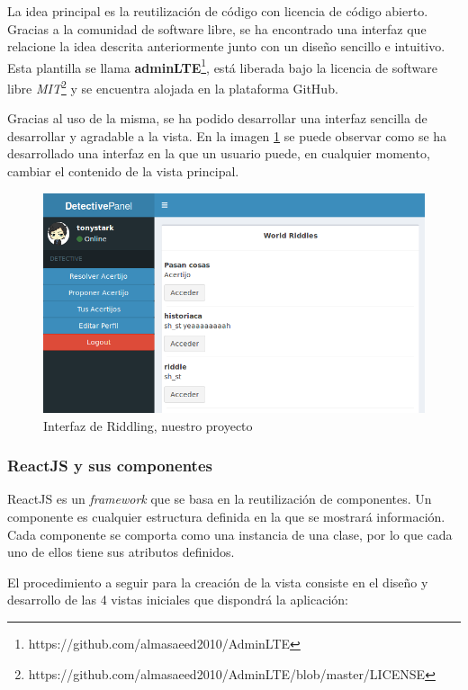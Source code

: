 La idea principal es la reutilización de código con licencia de código abierto. Gracias a la comunidad de software libre, se ha encontrado una interfaz que relacione la idea descrita anteriormente junto con un diseño sencillo e intuitivo. Esta plantilla se llama \textbf{adminLTE}\footnote{https://github.com/almasaeed2010/AdminLTE}, está liberada bajo la licencia de software libre \textit{MIT}\footnote{https://github.com/almasaeed2010/AdminLTE/blob/master/LICENSE} y se encuentra alojada en la plataforma GitHub.

Gracias al uso de la misma, se ha podido desarrollar una interfaz sencilla de desarrollar y agradable a la vista. En la imagen \ref{fig::rid} se puede observar como se ha desarrollado una interfaz en la que un usuario puede, en cualquier momento, cambiar el contenido de la vista principal.

\begin{figure}[htbp]
    \centerline{\includegraphics[width=12cm]{figuras/riddling.png}}
    \caption{Interfaz de Riddling, nuestro proyecto}
    \label{fig::rid}
\end{figure}

\subsubsection{ReactJS y sus componentes}

ReactJS es un \textit{framework} que se basa en la reutilización de componentes. Un componente es cualquier estructura definida en la que se mostrará información. Cada componente se comporta como una instancia de una clase, por lo que cada uno de ellos tiene sus atributos definidos.

El procedimiento a seguir para la creación de la vista consiste en el diseño y desarrollo de las 4 vistas iniciales que dispondrá la aplicación:

